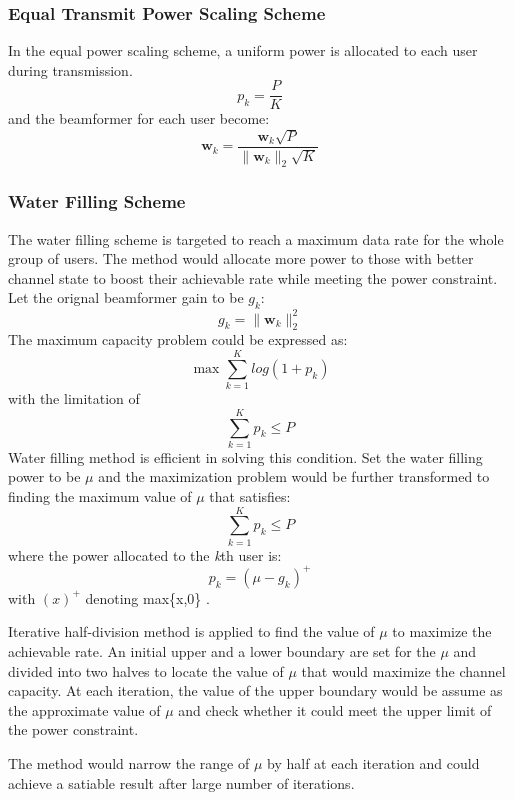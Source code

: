 \documentclass{article}
\begin{document}
\subsubsection{Equal Transmit Power Scaling Scheme}
In the equal power scaling scheme, a uniform power is allocated to each user during transmission.
\[p_k = \frac{P}{K}\]
and the beamformer for each user become:
\[\textbf{w}_k = \frac{\textbf{w}_k\sqrt{P}}{\lVert \textbf{w}_k \rVert_{2}\sqrt{K}}\]

\subsubsection{Water Filling Scheme}
The water filling scheme is targeted to reach a maximum data rate for the whole group of users.
The method would allocate more power to those with better channel state to boost their achievable rate while meeting the power constraint.
Let the orignal beamformer gain to be $g_k$:
\[g_k = \lVert \textbf{w}_k \rVert_{2}^2\]
The maximum capacity problem could be expressed as:
\[
\max \sum_{k=1}^{K} log(1+p_k)
\]
with the limitation of
\[\sum_{k=1}^{K} p_k \leq P\]
Water filling method is efficient in solving this condition.
Set the water filling power to be $\mu$ and the maximization problem would be further transformed
to finding the maximum value of $\mu$ that satisfies:
\[\sum_{k=1}^{K}p_k \leq P\]
where the power allocated to the \textit{k}th user is:
\[p_k = (\mu-g_k)^+\]
 with $(x)^+$ denoting max\{x,0\} \cite{TY1}.

\noindent
Iterative half-division method is applied to find the value of $\mu$ to maximize the achievable rate.
An initial upper and a lower boundary are set for the $\mu$ and divided into two halves to locate the value of $\mu$ that would maximize the channel capacity.
At each iteration, the value of the upper boundary would be assume as the approximate value of $\mu$ and check whether it could meet the upper limit of the power constraint.

\noindent
The method would narrow the range of $\mu$ by half at each iteration and could achieve a satiable result after large number of iterations.
\end{document}
